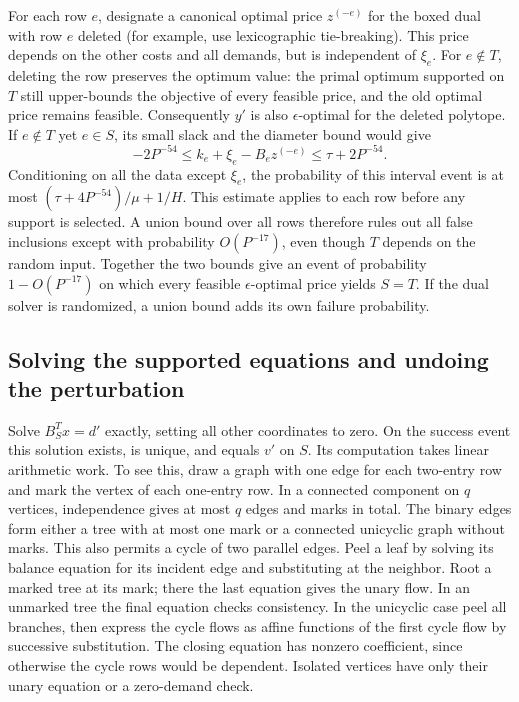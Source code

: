 \documentclass[11pt,letterpaper]{article}
\begin{document}
For each row \(e\), designate a canonical optimal price \(z^{(-e)}\) for
the boxed dual with row \(e\) deleted (for example, use lexicographic
tie-breaking). This price depends on the other costs and all demands,
but is independent of \(\xi_e\). For \(e\notin T\), deleting the row
preserves the optimum value: the primal optimum supported on \(T\)
still upper-bounds the objective of every feasible price, and the old
optimal price remains feasible. Consequently \(y'\) is also
\(\epsilon\)-optimal for the deleted polytope. If \(e\notin T\) yet
\(e\in S\), its small slack and the diameter bound would give
\[
   -2P^{-54}\le k_e+\xi_e-B_e z^{(-e)}\le \tau+2P^{-54}.
\]
Conditioning on all the data except \(\xi_e\), the probability of this
interval event is at most \((\tau+4P^{-54})/\mu+1/H\).
This estimate applies to each row before any support is selected. A
union bound over all rows therefore rules out all false inclusions
except with probability \(O(P^{-17})\), even though \(T\) depends on
the random input. Together the two bounds give an event of probability \(1-O(P^{-17})\)
on which every feasible \(\epsilon\)-optimal price yields \(S=T\). If the dual
solver is randomized, a union bound adds its own failure probability.

\subsection{Solving the supported equations and undoing the perturbation}

Solve \(B_S^Tx=d'\) exactly, setting all other coordinates to zero.
On the success event this solution exists, is unique, and equals \(v'\)
on \(S\). Its computation takes linear arithmetic work. To see this,
draw a graph with one edge for each two-entry row and mark the vertex
of each one-entry row. In a connected component on \(q\) vertices,
independence gives at most \(q\) edges and marks in total. The binary
edges form either a tree with at most one mark or a connected unicyclic
graph without marks. This also permits a cycle of two parallel edges.
Peel a leaf by solving its balance equation for its incident edge
and substituting at the neighbor. Root a marked tree at its mark;
there the last equation gives the unary flow. In an unmarked tree
the final equation checks consistency. In the unicyclic case peel
all branches, then express the cycle flows as affine functions of the
first cycle flow by successive substitution. The closing equation has
nonzero coefficient, since otherwise the cycle rows would be dependent.
Isolated vertices have only their unary equation or a zero-demand check.
\end{document}
